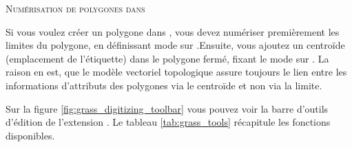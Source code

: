 \begin{Tip}\caption{\textsc{Numérisation de polygones dans \grass}}
Si vous voulez créer un polygone dans \grass, vous devez numériser premièrement les limites du polygone, en définissant mode sur .Ensuite, vous ajoutez un centroïde (emplacement de l'étiquette) dans le polygone fermé, fixant le mode sur . La raison en est, que le modèle vectoriel topologique assure toujours le lien entre les informations d'attributs des polygones via le centroïde et non via la limite.
\end{Tip}

\label{label_grasstoolbar}

Sur la figure \ref{fig:grass_digitizing_toolbar} vous pouvez voir la barre d'outils d'édition \grass de l'extension \grass. Le tableau \ref{tab:grass_tools} récapitule les fonctions disponibles.

